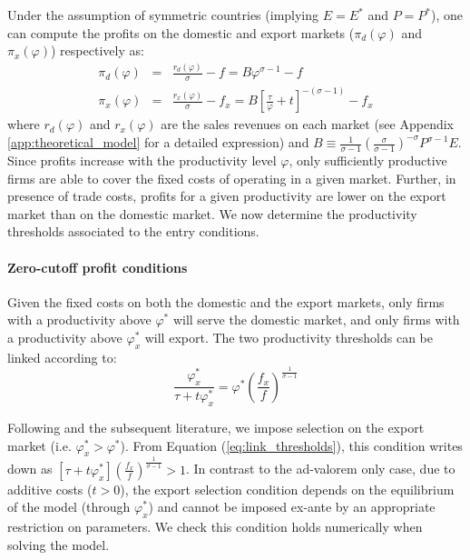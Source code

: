 \documentclass[a4paper,11pt]{article}
\begin{document}
Under the assumption of symmetric countries (implying $E=E^\ast$ and $P=P^\ast$), one can compute the profits on the domestic and export markets ($\pi_d(\varphi)$ and $\pi_x(\varphi)$) respectively as:
\begin{eqnarray}
\pi_d(\varphi)  &=& \frac{r_d(\varphi)}{\sigma} - f = B \varphi^{\sigma-1} - f \label{eq:pid_rd}\\
\pi_x(\varphi) &=& \frac{r_x(\varphi)}{\sigma} - f_x = B \left[ \frac{\tau}{\varphi} + t\right]^{-(\sigma-1)} - f_x \label{eq:pix_rx}
\end{eqnarray}
\noindent where $r_d(\varphi)$ and $r_x(\varphi)$ are the sales revenues on each market (see Appendix \ref{app:theoretical_model} for a detailed expression) and $B \equiv \frac{1}{\sigma-1}\left(\frac{\sigma}{\sigma-1}\right)^{-\sigma}P^{\sigma-1}E$. Since profits increase with the productivity level $\varphi$, only sufficiently productive firms are able to cover the fixed costs of operating in a given market. Further, in presence of trade costs, profits for a given productivity are lower on the export market than on the domestic market.
We now determine the productivity thresholds associated to the entry conditions.


\paragraph{Zero-cutoff profit conditions} Given the fixed costs on both the domestic and the export markets, only firms with a productivity above $\varphi^\ast$ will serve the domestic market, and only firms with a productivity above $\varphi_x^\ast$ will export. The two productivity thresholds can be linked according to:
\begin{equation}
\frac{\varphi_x^\ast}{\tau+t\varphi_x^\ast} = \varphi^\ast \left( \frac{f_x}{f} \right)^{\frac{1}{\sigma-1}} \label{eq:link_thresholds}
\end{equation}

Following \cite{melitz} and the subsequent literature, we impose selection on the export market (i.e. $\varphi_x^\ast > \varphi^\ast$). From Equation (\ref{eq:link_thresholds}), this condition writes down as $\left[\tau+ t\varphi^\ast_x \right] \left( \frac{f_x}{f} \right)^{\frac{1}{\sigma-1}} >1$. In contrast to the ad-valorem only case, due to additive costs ($t>0$), the export selection condition depends on the equilibrium of the model (through $\varphi^\ast_x $) and cannot be imposed ex-ante by an appropriate restriction on parameters. We check this condition holds numerically when solving the model.
\end{document}
